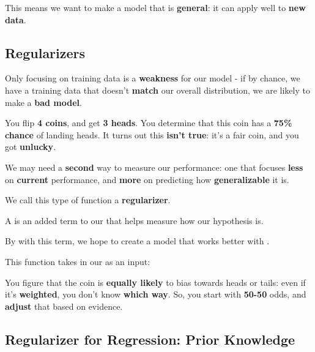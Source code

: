     This means we want to make a model that is \textbf{general}: it can apply well to \textbf{new data}.
    
    \subsection{Regularizers}
        
        Only focusing on training data is a \textbf{weakness} for our model - if by chance, we have a training data that doesn't \textbf{match} our overall distribution, we are likely to make a \textbf{bad model}.
        
        \miniex You flip \textbf{4 coins}, and get \textbf{3 heads}. You determine that this coin has a \textbf{75\% chance} of landing heads. It turns out this \textbf{isn't true}: it's a fair coin, and you got \textbf{unlucky}.
        
         We may need a \textbf{second} way to measure our performance: one that focuses \textbf{less} on \textbf{current} performance, and \textbf{more} on predicting how \textbf{generalizable} it is.
        
        We call this type of function a \textbf{regularizer}.\\
        
        \begin{definition}
            A  is an added term to our  that helps measure how  our hypothesis is.
            
            By  with this term, we hope to create a model that works better with .
            
            This function takes in our  \gren{$\Theta$} as an input: 
        \end{definition}
        
        \miniex You figure that the coin is \textbf{equally likely} to bias towards heads or tails: even if it's \textbf{weighted}, you don't know \textbf{which way}. So, you start with \textbf{50-50} odds, and \textbf{adjust} that based on evidence.
        
    \subsection{Regularizer for Regression: Prior Knowledge}
        
